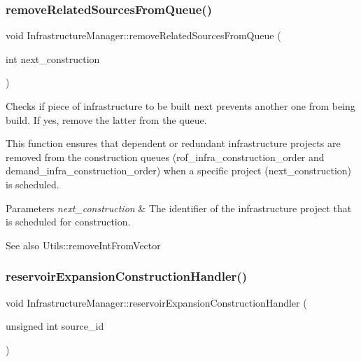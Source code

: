 \subsubsection{\texorpdfstring{remove\+Related\+Sources\+From\+Queue()}{removeRelatedSourcesFromQueue()}}
{\footnotesize\ttfamily void Infrastructure\+Manager\+::remove\+Related\+Sources\+From\+Queue (\begin{DoxyParamCaption}\item[{int}]{next\+\_\+construction }\end{DoxyParamCaption})}



Checks if piece of infrastructure to be built next prevents another one from being build. If yes, remove the latter from the queue. 

This function ensures that dependent or redundant infrastructure projects are removed from the construction queues ({\ttfamily rof\+\_\+infra\+\_\+construction\+\_\+order} and {\ttfamily demand\+\_\+infra\+\_\+construction\+\_\+order}) when a specific project ({\ttfamily next\+\_\+construction}) is scheduled.


\begin{DoxyParams}{Parameters}
{\em next\+\_\+construction} & The identifier of the infrastructure project that is scheduled for construction.\\
\hline
\end{DoxyParams}
\begin{DoxySeeAlso}{See also}
Utils\+::remove\+Int\+From\+Vector 
\end{DoxySeeAlso}
\mbox{\label{classInfrastructureManager_ad4dc157110b29560cd47501ba67bcba3}} 
\subsubsection{\texorpdfstring{reservoir\+Expansion\+Construction\+Handler()}{reservoirExpansionConstructionHandler()}}
{\footnotesize\ttfamily void Infrastructure\+Manager\+::reservoir\+Expansion\+Construction\+Handler (\begin{DoxyParamCaption}\item[{unsigned int}]{source\+\_\+id }\end{DoxyParamCaption})}



